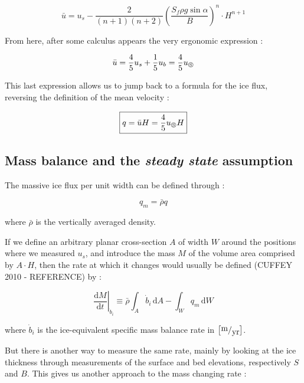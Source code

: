 \begin{equation}\bar{u} = u_s - \frac{2}{(n+1)(n+2)} \left( \frac{S_f \rho g \sin{\alpha}}{B}\right)^n \cdot H^{n+1}\end{equation}

From here, after some calculus appears the very ergonomic expression :

\begin{equation}\bar{u} = \frac{4}{5}u_s + \frac{1}{5}u_b = \frac{4}{5}u_\circledS\end{equation}

This last expression allows us to jump back to a formula for the ice flux, reversing the definition of the mean velocity :

\begin{equation}
\boxed{q = \bar{u}H = \frac{4}{5}u_\circledS H}
\end{equation}


\subsection*{Mass balance and the \textit{steady state} assumption}

The massive ice flux per unit width can be defined through :

\begin{equation}q_m = \bar{\rho}q\end{equation}

where $\bar{\rho}$ is the vertically averaged density.

If we define an arbitrary planar cross-section $A$ of width $W$ around the positions where we measured $u_s$, and introduce the mass $M$ of the volume area comprised by $A \cdot H$, then the rate at which it changes would usually be defined (CUFFEY 2010 - REFERENCE) by :
 
\begin{equation}\left. \frac{\mathrm{d} M}{\mathrm{d}t} \right|_{\dot{b}_i} \equiv \bar{\rho} \int_A \dot{b}_i \, \mathrm{d}A - \int_W q_m \, \mathrm{d} W \end{equation}

where $\dot{b}_i$ is the ice-equivalent specific mass balance rate in $\left[ \fraction{m}{yr} \right]$.

But there is another way to measure the same rate, mainly by looking at the ice thickness through measurements of the surface and bed elevations, respectively $S$ and $B$. This gives us another approach to the mass changing rate :

